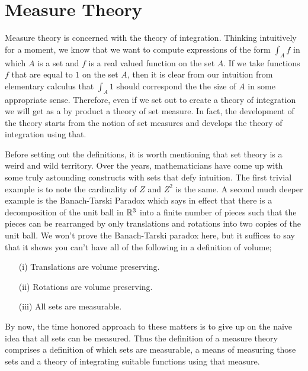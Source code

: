 \chapter{Measure Theory}
Measure theory is concerned with the theory of integration.  Thinking
intuitively for a moment, we know that we want to compute
expressions of the form $\int_A f$ in which $A$ is a set and $f$ is a
real valued function on the set $A$.  If we take functions $f$ that
are equal to $1$ on the set $A$, then it is clear from our intuition
from elementary calculus that $\int_A 1$ should correspond the the
size of $A$ in some appropriate sense.  Therefore, even if we set out
to create a theory of integration we will get as a by product a theory
of set measure.  In fact, the development of the theory starts from
the notion of set measures and develops the theory of integration
using that.

Before setting out the definitions, it is worth mentioning that set
theory is a weird and wild territory.  Over the years, mathematicians
have come up with some truly astounding constructs with sets that defy
intuition. The first trivial example is to note the cardinality of $Z$
and $Z^2$ is the same.  A second much deeper example is the
Banach-Tarski Paradox which says in effect that there is a
decomposition of the unit ball in $\mathbb{R}^3$ into a finite number of
pieces such that the pieces can be rearranged by only translations and
rotations into two copies of the unit ball.  We won't prove the
Banach-Tarski paradox here, but it suffices to say that it shows you
can't have all of the following in a definition of volume;
\begin{itemize}
\item[(i)]Translations are volume preserving.
\item[(ii)]Rotations are volume preserving.
\item[(iii)]All sets are measurable.
\end{itemize}

By now, the time honored approach to these matters is to give up on
the naive idea that all sets can be measured.  Thus the definition of a measure theory comprises a definition of
which sets are measurable, a means of measuring those sets and a
theory of integrating suitable functions using that measure.



